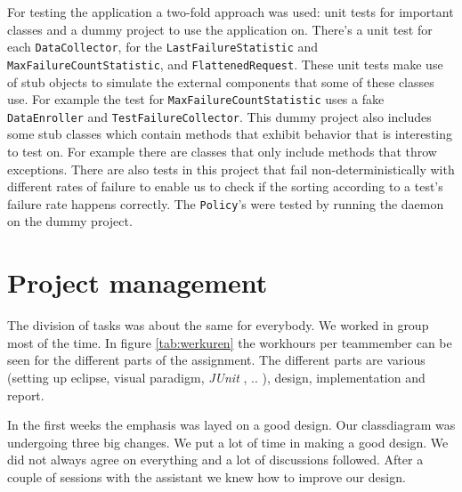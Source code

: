 \documentclass[i2]{oss}
\newcommand{\class}[1]{\texttt{#1}}
\newcommand{\junit}{\emph{JUnit }}
\begin{document}
For testing the application a two-fold approach was used: unit tests for
important classes and a dummy project to use the application on.
There's a unit test for each \class{DataCollector}, for the 
\class{LastFailureStatistic} and \class{MaxFailureCountStatistic}, and  \class{FlattenedRequest}.
These unit tests make use of stub objects to simulate the external 
components that some of these classes use.
For example the test for \class{MaxFailureCountStatistic} uses a fake
\class{DataEnroller} and \class{TestFailureCollector}.
This dummy project also includes some stub classes which contain methods 
that exhibit behavior that is interesting to test on.
For example there are classes that only include methods that throw 
exceptions.
There are also tests in this project that fail non-deterministically with 
different rates of failure to enable us to check if the sorting according 
to a test's failure rate happens correctly.
The \class{Policy}'s were tested by running the daemon on the dummy 
project.



\section{Project management}
\label{ssec:Projectmanag}

The division of tasks was about the same for everybody. We worked in group most of the time. In figure \ref{tab:werkuren} the workhours per teammember can be seen for the different parts of the assignment. The different parts are various (setting up eclipse, visual paradigm, \junit, .. ), design, implementation and report. 

In the first weeks the emphasis was layed on a good design. Our classdiagram was undergoing three big changes. We put a lot of time in making a good design. We did not always agree on everything and a lot of discussions followed. After a couple of sessions with the assistant we knew how to improve our design. 
\end{document}
